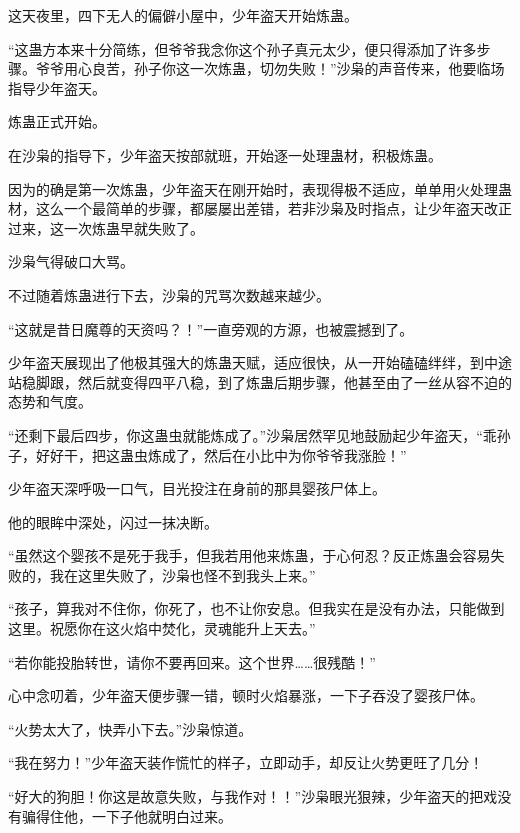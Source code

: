 \begin{this_body}
这天夜里，四下无人的偏僻小屋中，少年盗天开始炼蛊。

“这蛊方本来十分简练，但爷爷我念你这个孙子真元太少，便只得添加了许多步骤。爷爷用心良苦，孙子你这一次炼蛊，切勿失败！”沙枭的声音传来，他要临场指导少年盗天。

炼蛊正式开始。

在沙枭的指导下，少年盗天按部就班，开始逐一处理蛊材，积极炼蛊。

因为的确是第一次炼蛊，少年盗天在刚开始时，表现得极不适应，单单用火处理蛊材，这么一个最简单的步骤，都屡屡出差错，若非沙枭及时指点，让少年盗天改正过来，这一次炼蛊早就失败了。

沙枭气得破口大骂。

不过随着炼蛊进行下去，沙枭的咒骂次数越来越少。

“这就是昔日魔尊的天资吗？！”一直旁观的方源，也被震撼到了。

少年盗天展现出了他极其强大的炼蛊天赋，适应很快，从一开始磕磕绊绊，到中途站稳脚跟，然后就变得四平八稳，到了炼蛊后期步骤，他甚至由了一丝从容不迫的态势和气度。

“还剩下最后四步，你这蛊虫就能炼成了。”沙枭居然罕见地鼓励起少年盗天，“乖孙子，好好干，把这蛊虫炼成了，然后在小比中为你爷爷我涨脸！”

少年盗天深呼吸一口气，目光投注在身前的那具婴孩尸体上。

他的眼眸中深处，闪过一抹决断。

“虽然这个婴孩不是死于我手，但我若用他来炼蛊，于心何忍？反正炼蛊会容易失败的，我在这里失败了，沙枭也怪不到我头上来。”

“孩子，算我对不住你，你死了，也不让你安息。但我实在是没有办法，只能做到这里。祝愿你在这火焰中焚化，灵魂能升上天去。”

“若你能投胎转世，请你不要再回来。这个世界……很残酷！”

心中念叨着，少年盗天便步骤一错，顿时火焰暴涨，一下子吞没了婴孩尸体。

“火势太大了，快弄小下去。”沙枭惊道。

“我在努力！”少年盗天装作慌忙的样子，立即动手，却反让火势更旺了几分！

“好大的狗胆！你这是故意失败，与我作对！！”沙枭眼光狠辣，少年盗天的把戏没有骗得住他，一下子他就明白过来。

\end{this_body}

